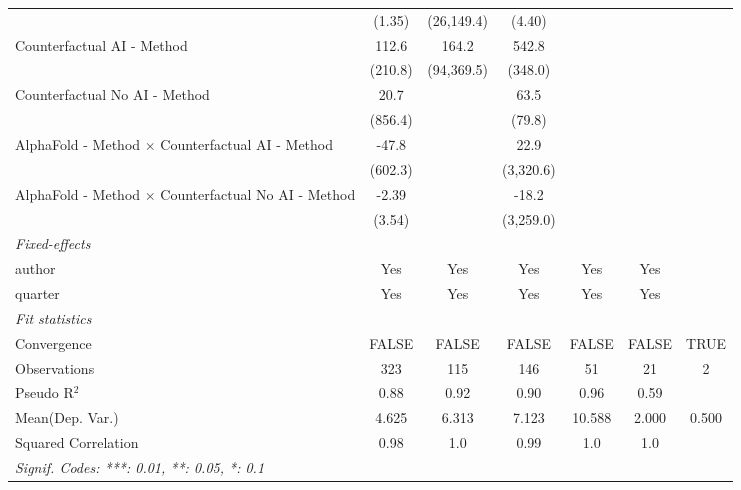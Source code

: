 \begin{tabular}{lcccccc}
                                                              & (1.35)       & (26,149.4) & (4.40)    &           &         &   \\   
   Counterfactual AI - Method                                 & 112.6        & 164.2      & 542.8     &           &         &   \\   
                                                              & (210.8)      & (94,369.5) & (348.0)   &           &         &   \\   
   Counterfactual No AI - Method                              & 20.7         &            & 63.5      &           &         &   \\   
                                                              & (856.4)      &            & (79.8)    &           &         &   \\   
   AlphaFold - Method $\times$ Counterfactual AI - Method     & -47.8        &            & 22.9      &           &         &   \\   
                                                              & (602.3)      &            & (3,320.6) &           &         &   \\   
   AlphaFold - Method $\times$ Counterfactual No AI - Method  & -2.39        &            & -18.2     &           &         &   \\   
                                                              & (3.54)       &            & (3,259.0) &           &         &   \\   
   \midrule
   \emph{Fixed-effects}\\
   author                                                     & Yes          & Yes        & Yes       & Yes       & Yes     & \\  
   quarter                                                    & Yes          & Yes        & Yes       & Yes       & Yes     & \\  
   \midrule
   \emph{Fit statistics}\\
   Convergence                                                &FALSE         & FALSE      & FALSE     & FALSE     & FALSE   & TRUE\\  
   Observations                                               & 323          & 115        & 146       & 51        & 21      & 2\\  
   Pseudo R$^2$                                               & 0.88         & 0.92       & 0.90      & 0.96      & 0.59    & \\  
Mean(Dep. Var.) & 4.625 & 6.313 & 7.123 & 10.588 & 2.000 & 0.500 \\
   Squared Correlation                                        & 0.98         & 1.0        & 0.99      & 1.0       & 1.0     & \\  
   \midrule \midrule
   \multicolumn{7}{l}{\emph{Signif. Codes: ***: 0.01, **: 0.05, *: 0.1}}\\
\end{tabular}
\par\endgroup
